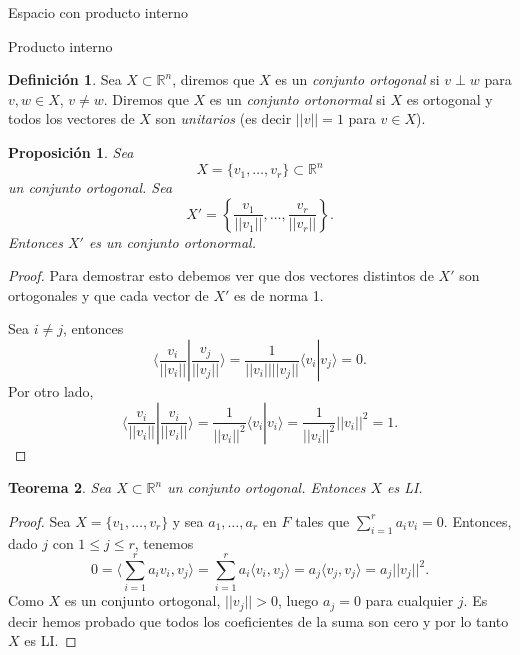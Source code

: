 \documentclass[a4paper,12pt,twoside,spanish]{amsbook}
\newtheorem{teorema}{Teorema}[section]
\newtheorem{proposicion}[teorema]{Proposici\'on}
\theoremstyle{definition}
\newtheorem{definicion}{Definici\'on}[section]
\theoremstyle{remark}
\newcommand{\la}{\langle}
\newcommand{\ra}{\rangle}
\newcommand{\R}{\mathbb R}
\begin{document}
\begin{chapter}{Espacio con producto interno}
\begin{section}{Producto interno}
		\begin{definicion} Sea $X \subset \R^n$, diremos que $X$ es un \emph{conjunto ortogonal} si $v\perp w$ para $v,w \in X$, $v\not= w$. Diremos que $X$ es un \emph{conjunto ortonormal} si $X$ es ortogonal y todos los vectores de $X$ son  \textit{unitarios} (es decir $||v|| =1$ para $v \in X$).
		\end{definicion}
	
		
		\begin{proposicion}\label{ortogonal->ortonormal}
			Sea  $$X = \{v_1,\ldots,v_r \} \subset \R^n$$ un conjunto ortogonal. Sea 
			\begin{equation*}
				X' =  \left\{\frac{v_1}{||v_1||},\ldots,\frac{v_r}{||v_r||} \right\}.
			\end{equation*}
			Entonces $X'$ es  un conjunto ortonormal. 
		\end{proposicion}
		\begin{proof}
			Para demostrar esto debemos ver que dos vectores distintos de $X'$ son ortogonales y que cada vector de $X'$ es de norma 1.
			
			Sea $i \ne j$, entonces
			\begin{equation*}
			\la \frac{v_i}{||v_i||} | \frac{v_j}{||v_j||}\ra = \frac{1}{||v_i||||v_j||} \la v_i | v_j\ra = 0.
			\end{equation*}
			Por otro lado,
			\begin{equation*}
			\la \frac{v_i}{||v_i||} | \frac{v_i}{||v_i||}\ra = \frac{1}{||v_i||^2} \la v_i | v_i\ra=  \frac{1}{||v_i||^2}||v_i||^2 =1.
			\end{equation*}
		\end{proof}	
			
			
			
		
		
		\medskip
		
		\begin{teorema}\label{th-ortogonal-implica-li} Sea $X \subset \R^n$ un conjunto  ortogonal. Entonces $X$ es LI. 
		\end{teorema}
		\begin{proof} Sea $X =\{v_1,\ldots,v_r \}$ y sea $a_1,\ldots,a_r$ en $F$ tales que  $\sum_{i=1}^r a_iv_i =0$. Entonces,  dado $j$ con $1 \le j \le r$,  tenemos 
			$$
			0=\la\sum_{i=1}^r a_iv_i ,v_j \ra = \sum_{i=1}^r a_i\la v_i ,v_j \ra = a_j\la v_j ,v_j \ra = a_j||v_j||^2.
			$$
			Como $X$  es un conjunto ortogonal,  $||v_j|| >0$, luego $a_j =0$ para cualquier $j$. Es decir hemos probado que todos los coeficientes de la suma son cero y por lo tanto $X$  es LI.
		\end{proof}
		

\end{section}
\end{chapter}
\end{document}

